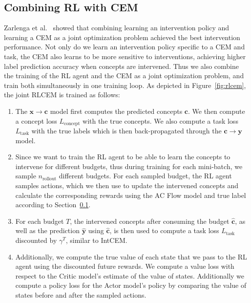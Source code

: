 \subsection{Combining RL with CEM}

Zarlenga et al.~\cite{intcem} showed that combining learning an intervention policy
and learning a CEM as a joint optimization problem achieved the best intervention performance.
Not only do we learn an intervention policy specific to a CEM and task, the 
CEM also learns to be more sensitive to interventions, achieving higher label prediction accuracy
when concepts are intervened. Thus we also combine the training of the RL agent and the CEM
as a joint optimization problem, and train
both simultaneously in one training loop.
As depicted in Figure~\ref{fig:rlcem}, the joint RLCEM
is trained as follows:

\begin{enumerate}
    \item The $\mathbf{x} \to \mathbf{c}$ model first computes the predicted concepts $\mathbf{c}$.
    We then compute a concept loss $L_{\text{concept}}$ with the true concepts.
    We also compute a task loss $L_{\text{task}}$ with the true labels
    which is then 
    back-propagated through the $\mathbf{c} \to \mathbf{y}$ model.
    \item Since we want to train the RL agent to be able to learn 
    the concepts to intervene for different budgets, thus during training 
    for each mini-batch, we sample $n_{\text{rollout}}$ different budgets.
    For each sampled budget, the RL agent samples actions, which we then use to 
    update the intervened concepts and calculate the corresponding rewards
    using the AC Flow model and true label according to Section~\ref{}.
    \item For each budget $T$, 
    the intervened concepts after consuming the budget $\hat{\mathbf{c}}$,
    as well as the prediction $\hat{\mathbf{y}}$ using $\hat{\mathbf{c}}$,
    is then used to compute a task loss $L_{\text{task}}$ 
    discounted by $\gamma^T$, similar to IntCEM.
    \item Additionally, we compute the true value of each state 
    that we pass to the RL agent using the discounted future rewards.
    We compute a value loss with respect to the
    Critic model's estimate of the value of states.
    Additionally we compute a policy loss for the 
    Actor model's policy by comparing the value of states
    before and after the sampled actions.
\end{enumerate}

